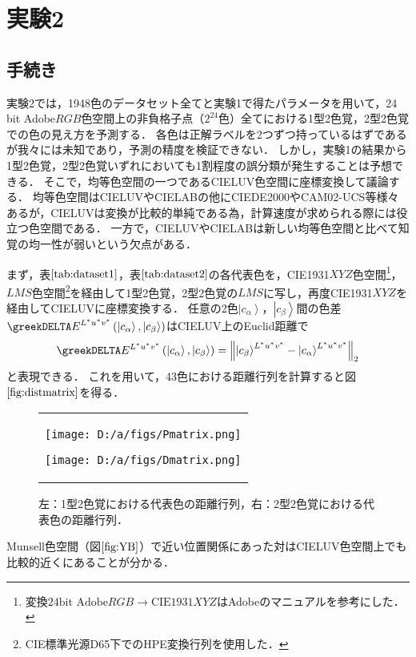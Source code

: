 \documentclass[uplatex,paper=a4,fontsize=4.0truemm,jafontsize=4.0truemm,head_space=30.0truemm,foot_space=30.0truemm,baselineskip=8.0truemm,line_length=40zw,gutter=25.0truemm,oneside,openany,fleqn,hanging_panctuation,open_bracket_pos=nibu_tentsuki,dvipdfmx,jis2004,book,titlepage]{jlreq}
\theoremstyle{mystyle}
\newcommand{\captiondot}[1]{\caption{#1．}}
\newcommand{\mathdisplaystyle}[1]{\(\displaystyle{#1}\)}
\newcommand{\Reference}[1]{\mathdisplaystyle{\ref{#1}}}
\newcommand{\parentheses}[1]{\left(#1\right)}
\newcommand{\norm}[2]{{\left\lVert#1\right\rVert}_{#2}}
\newcommand{\Diracket}[1]{\left\lvert#1\right\rangle}
\begin{document}
		\section{実験2}
			\subsection{手続き}
				実験2では，1948色のデータセット全てと実験1で得たパラメータを用いて，24 bit Adobe\mathdisplaystyle{RGB}色空間上の非負格子点（\mathdisplaystyle{2^{24}}色）全てにおける1型2色覚，2型2色覚での色の見え方を予測する．
				各色は正解ラベルを2つずつ持っているはずであるが我々には未知であり，予測の精度を検証できない．
				しかし，実験1の結果から1型2色覚，2型2色覚いずれにおいても1割程度の誤分類が発生することは予想できる．
				そこで，均等色空間の一つであるCIELUV色空間に座標変換して議論する．
				均等色空間はCIELUVやCIELABの他にCIEDE2000やCAM02-UCS等様々ある\cite{Yaguchi2017b}が，CIELUVは変換が比較的単純である為，計算速度が求められる際には役立つ色空間である．
				一方で，CIELUVやCIELABは新しい均等色空間と比べて知覚の均一性が弱いという欠点がある\cite[p.~10]{Robertson1977}．

				まず，表\Reference{tab:dataset1}，表\Reference{tab:dataset2}の各代表色を，CIE1931\mathdisplaystyle{XYZ}色空間\footnote{変換\mathdisplaystyle{\textrm{24bit Adobe}RGB\to\textrm{CIE1931}XYZ}はAdobe\textregistered のマニュアル\cite{Adobe2005}を参考にした．}，\mathdisplaystyle{LMS}色空間\footnote{CIE標準光源D65下でのHPE変換行列を使用した．}を経由して1型2色覚，2型2色覚の\mathdisplaystyle{LMS}に写し，再度CIE1931\mathdisplaystyle{XYZ}を経由してCIELUVに座標変換する．
				任意の2色\mathdisplaystyle{\Diracket{c_\alpha}}，\mathdisplaystyle{\Diracket{c_\beta}}間の色差\mathdisplaystyle{\greekDELTA E^{L^\ast u^\ast v^\ast}\parentheses{\Diracket{c_\alpha},\Diracket{c_\beta}}}はCIELUV上のEuclid距離で
				\begin{equation*}
					\greekDELTA E^{L^\ast u^\ast v^\ast}\parentheses{\Diracket{c_\alpha},\Diracket{c_\beta}}=\norm{\Diracket{c_\beta}^{L^\ast u^\ast v^\ast}-\Diracket{c_\alpha}^{L^\ast u^\ast v^\ast}}{2}
				\end{equation*}
				と表現できる．
				これを用いて，43色における距離行列を計算すると図\Reference{fig:distmatrix}を得る．
				\begin{figure}[tbp]
					\centering
					\begin{tabular}{c}
						\begin{minipage}{0.5\linewidth}
							\centering
							\texttt{[image: D:/a/figs/Pmatrix.png]}
						\end{minipage}
						\begin{minipage}{0.5\linewidth}
							\centering
							\texttt{[image: D:/a/figs/Dmatrix.png]}
						\end{minipage}
					\end{tabular}
					\captiondot{左：1型2色覚における代表色の距離行列，右：2型2色覚における代表色の距離行列}\label{fig:distmatrix}
				\end{figure}
				Munsell色空間（図\Reference{fig:YB}）で近い位置関係にあった対はCIELUV色空間上でも比較的近くにあることが分かる．
\end{document}
